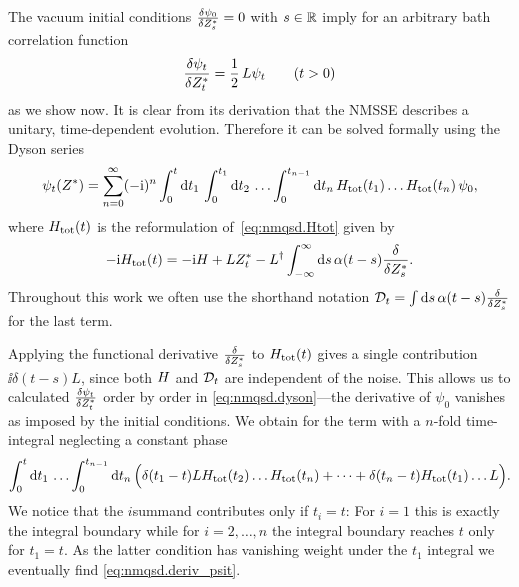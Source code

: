 The vacuum initial conditions $\frac{\delta \psi_0}{\delta {Z}^*_s} = 0$ with $s \in \mathbb{R}$ imply for an arbitrary bath correlation function
\begin{equation}
  \frac{\delta \psi_t}{\delta {Z}^*_t} = \frac{1}{2} \, L \psi_t \qquad (t > 0)
  \label{eq:nmqsd.deriv_psit}
\end{equation}
as we show now.
It is clear from its derivation that the NMSSE describes a unitary, time-dependent evolution.
Therefore it can be solved formally using the Dyson series
\begin{equation}
  \psi_t(\ZZ) = \sum_{n=0}^\infty (-\ii)^n \intl{0}{t}{t_1} \intl{0}{t_1}{t_2} \dots \intl{0}{t_{n-1}}{t_n}  \Htot(t_1) \dots \Htot(t_n) \, \psi_0,
  \label{eq:nmqsd.dyson}
\end{equation}
where $H_\mathrm{tot}(t)$ is the reformulation of~\ref{eq:nmqsd.Htot} given by
\begin{equation*}
  -\mathrm{i} H_\mathrm{tot}(t) = -\mathrm{i} H + L {Z}^*_t - L^\dagger \int_{-\infty}^{\infty}\mathrm{d}s\, \alpha(t-s) \frac{\delta}{\delta {Z}^*_s}.
\end{equation*}
Throughout this work we often use the shorthand notation $\mathcal{D}_t = \int\mathrm{d}s \, \alpha(t-s) \frac{\delta}{\delta {Z}^*_s}$ for the last term.

Applying the functional derivative $\frac{\delta}{\delta {Z}^*_s}$ to $H_\mathrm{tot}(t)$ gives a single contribution $\ii \delta(t - s) L$, since both $H$ and $\mathcal{D}_t$ are independent of the noise.
This allows us to calculated $\frac{\delta \psi_t}{\delta {Z}^*_t}$ order by order in \autoref{eq:nmqsd.dyson}---the derivative of $\psi_0$ vanishes as imposed by the initial conditions.
We obtain for the term with a $n$-fold time-integral neglecting a constant phase
\begin{equation*}
  \intl{0}{t}{t_1} \dots \intl{0}{t_{n-1}}{t_n} \Big( \delta(t_1 - t) L \Htot(t_2) \dots \Htot(t_n) + \dots + \delta(t_n - t) \Htot(t_1) \dots L \Big).
\end{equation*}
We notice that the $i$\th summand contributes only if $t_i = t$:
For $i = 1$ this is exactly the integral boundary while for $i=2,\dots,n$ the integral boundary reaches $t$ only for $t_1 = t$.
As the latter condition has vanishing weight under the $t_1$ integral we eventually find \autoref{eq:nmqsd.deriv_psit}.


